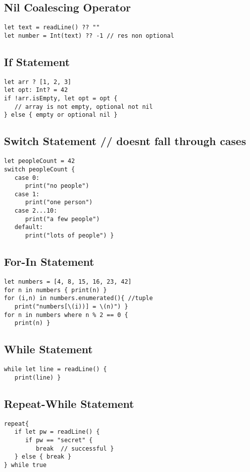 \subsection{Nil Coalescing Operator}
\begin{lstlisting}
let text = readLine() ?? ""
let number = Int(text) ?? -1 // res non optional
\end{lstlisting}

\subsection{If Statement}
\begin{lstlisting}
let arr ? [1, 2, 3]
let opt: Int? = 42
if !arr.isEmpty, let opt = opt {
   // array is not empty, optional not nil
} else { empty or optional nil }
\end{lstlisting}

\subsection{Switch Statement // doesnt fall through cases}
\begin{lstlisting}
let peopleCount = 42
switch peopleCount {
   case 0:
      print("no people")
   case 1:
      print("one person")
   case 2...10:
      print("a few people")
   default:
      print("lots of people") }
\end{lstlisting}

\subsection{For-In Statement}
\begin{lstlisting}
let numbers = [4, 8, 15, 16, 23, 42]
for n in numbers { print(n) }
for (i,n) in numbers.enumerated(){ //tuple
   print("numbers[\(i))] = \(n)") }
for n in numbers where n % 2 == 0 {
   print(n) }
\end{lstlisting}

\subsection{While Statement}
\begin{lstlisting}
while let line = readLine() {
   print(line) }
\end{lstlisting}

\subsection{Repeat-While Statement}
\begin{lstlisting}
repeat{
   if let pw = readLine() {
      if pw == "secret" {
         break  // successful }
   } else { break }
} while true
\end{lstlisting}

